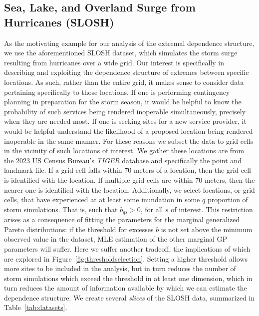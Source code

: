 \subsection{Sea, Lake, and Overland Surge from Hurricanes (SLOSH)\label{ref:slosh}}
As the motivating example for our analysis of the extremal dependence structure, we 
    use the aforementioned SLOSH dataset, which simulates the storm surge resulting 
    from hurricanes over a wide grid.  Our interest is specifically in describing 
    and exploiting the dependence structure of extremes between specific locations.  
    As such, rather than the entire grid, it makes sense to consider data pertaining
    specifically to those locations. If one is performing contingency planning in 
    preparation for the storm season, it would be helpful to know the probability of 
    such services being rendered 
    inoperable simultaneously, precisely when they are needed most.  If one is 
    seeking sites for a new service provider, it would be helpful understand the 
    likelihood of a proposed location being rendered inoperable in the same 
    manner.  For these reasons we subset the data to grid cells in the 
    vicinity of such locations of interest.  We gather these locations are from 
    the 2023 US Census Bureau's \emph{TIGER} database \needcite and specifically 
    the point and landmark file.  If a grid cell falls within 70 meters of a location,
    then the grid cell is identified with the location.  If multiple grid cells
    are within 70 meters, then the nearer one is identified with the location.
    Additionally, we select locations, or grid cells, that have experienced at
    at least some inundation in some $q$ proportion of storm simulations.  That is,
    such that $b_{qs} > 0$, for all $s$ of interest.  This restriction arises
    as a consequence of fitting the parameters for the marginal generalized Pareto
    distributions: if the threshold for excesses $b$ is not set above the minimum observed
    value in the dataset, MLE estimation of the other marginal GP parameters will suffer.
    Here we suffer another tradeoff, the implications of which are explored in 
    Figure~\ref{fig:thresholdselection}.  Setting a higher threshold allows more 
    sites to be included in the analysis, but in turn reduces the number of storm 
    simulations which exceed the threshold in at least one dimension, which in turn 
    reduces the amount of information available by which we can estimate the 
    dependence structure.  We create several \emph{slices} of the SLOSH data,
    summarized in Table~\ref{tab:datasets}.

